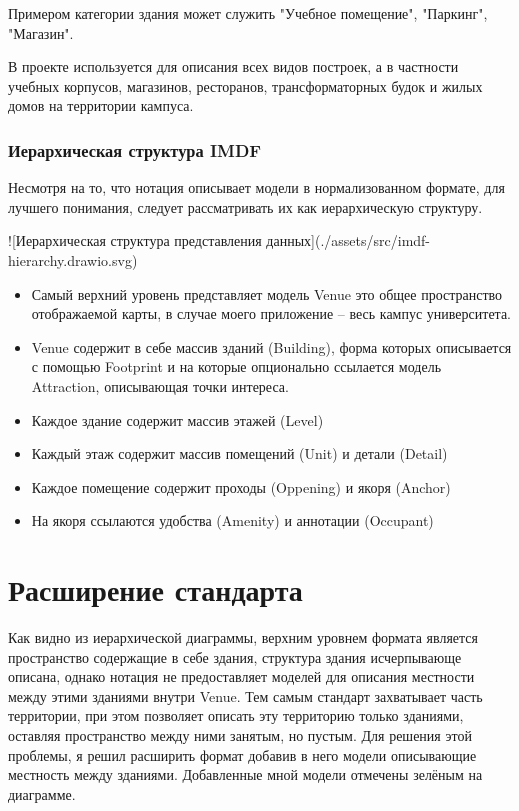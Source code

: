         Примером категории здания может служить "Учебное помещение", "Паркинг", "Магазин".

        В проекте используется для описания всех видов построек, а в частности учебных корпусов, магазинов, ресторанов, трансформаторных будок и жилых домов на территории кампуса.

    \subsubsection{Иерархическая структура IMDF}
      Несмотря на то, что нотация описывает модели в нормализованном формате, для лучшего понимания, следует рассматривать их как иерархическую структуру.

      ![Иерархическая структура представления данных](./assets/src/imdf-hierarchy.drawio.svg)

      \begin{itemize}
        \item Самый верхний уровень представляет модель Venue это общее пространство отображаемой карты, в случае моего приложение -- весь кампус университета.
        \item Venue содержит в себе массив зданий (Building), форма которых описывается с помощью Footprint и на которые опционально ссылается модель Attraction, описывающая точки интереса.
        \item Каждое здание содержит массив этажей (Level)
        \item Каждый этаж содержит массив помещений (Unit) и детали (Detail)
        \item Каждое помещение содержит проходы (Oppening) и якоря (Anchor)
        \item На якоря ссылаются удобства (Amenity) и аннотации (Occupant)
      \end{itemize}

  \section{Расширение стандарта}
    Как видно из иерархической диаграммы, верхним уровнем формата является пространство содержащие в себе здания, структура здания исчерпывающе описана, однако нотация не предоставляет моделей для описания местности между этими зданиями внутри Venue. Тем самым стандарт захватывает часть территории, при этом позволяет описать эту территорию только зданиями, оставляя пространство между ними занятым, но пустым.
    Для решения этой проблемы, я решил расширить формат добавив в него модели описывающие местность между зданиями. Добавленные мной модели отмечены зелёным на диаграмме.


